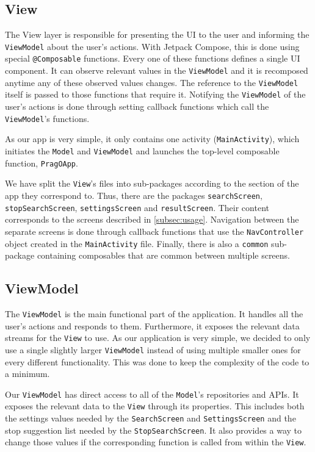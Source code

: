 \subsection{View}

The View layer is responsible for presenting the UI to the user and informing the \texttt{ViewModel} about the user's actions. With Jetpack Compose, this is done using special \texttt{@Composable} functions. Every one of these functions defines a single UI component. It can observe relevant values in the \texttt{ViewModel} and it is recomposed anytime any of these observed values changes. The reference to the \texttt{ViewModel} itself is passed to those functions that require it. Notifying the \texttt{ViewModel} of the user's actions is done through setting callback functions which call the \texttt{ViewModel}'s functions.

As our app is very simple, it only contains one activity (\texttt{MainActivity}), which initiates the \texttt{Model} and \texttt{ViewModel} and launches the top-level composable function, \texttt{PragOApp}.

We have split the \texttt{View}'s files into sub-packages according to the section of the app they correspond to. Thus, there are the packages \texttt{searchScreen}, \texttt{stopSearchScreen}, \texttt{settingsScreen} and \texttt{resultScreen}. Their content corresponds to the screens described in \cref{subsec:usage}. Navigation between the separate screens is done through callback functions that use the \texttt{NavController} object created in the \texttt{MainActivity} file. Finally, there is also a \texttt{common} sub-package containing composables that are common between multiple screens.

\subsection{ViewModel}

The \texttt{ViewModel} is the main functional part of the application. It handles all the user's actions and responds to them. Furthermore, it exposes the relevant data streams for the \texttt{View} to use. As our application is very simple, we decided to only use a single slightly larger \texttt{ViewModel} instead of using multiple smaller ones for every different functionality. This was done to keep the complexity of the code to a minimum.

Our \texttt{ViewModel} has direct access to all of the \texttt{Model}'s repositories and APIs. It exposes the relevant data to the \texttt{View} through its properties. This includes both the settings values needed by the \texttt{SearchScreen} and \texttt{SettingsScreen} and the stop suggestion list needed by the \texttt{StopSearchScreen}. It also provides a way to change those values if the corresponding function is called from within the \texttt{View}.

